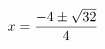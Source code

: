 \documentclass[preview]{standalone}
\begin{document}
\begin{align*}
\special{dvisvgm:raw <g id='unique000'>}x=\frac{-4\pm\sqrt{32}}{4}\special{dvisvgm:raw </g>}
\end{align*}
\end{document}
